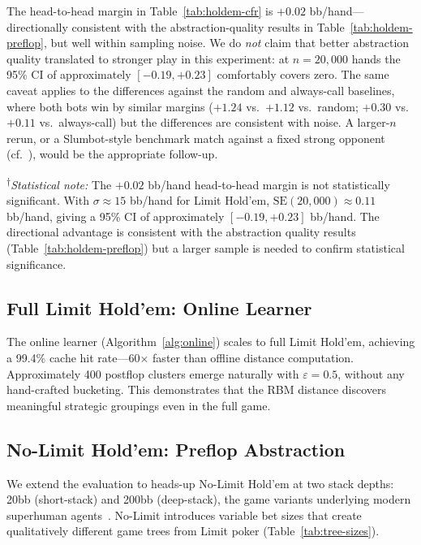 \documentclass[11pt]{article}
\begin{document}
The head-to-head margin in Table~\ref{tab:holdem-cfr} is $+0.02$
bb/hand---directionally consistent with the abstraction-quality
results in Table~\ref{tab:holdem-preflop}, but well within sampling
noise. We do \emph{not} claim that better abstraction quality
translated to stronger play in this experiment: at $n = 20{,}000$
hands the 95\% CI of approximately $[-0.19, +0.23]$ comfortably covers
zero. The same caveat applies to the differences against the random
and always-call baselines, where both bots win by similar margins
($+1.24$ vs.\ $+1.12$ vs.\ random; $+0.30$ vs.\ $+0.11$ vs.\
always-call) but the differences are consistent with noise. A
larger-$n$ rerun, or a Slumbot-style benchmark match against a fixed
strong opponent (cf.\ \citealt{johanson2013evaluating}), would be the
appropriate follow-up.

\noindent\textsuperscript{$\dagger$}\textit{Statistical note:} The
$+0.02$ bb/hand head-to-head margin is not statistically significant.
With $\sigma \approx 15$ bb/hand for Limit Hold'em, $\mathrm{SE}(20{,}000)
\approx 0.11$ bb/hand, giving a 95\% CI of approximately
$[-0.19, +0.23]$ bb/hand. The directional advantage is consistent with
the abstraction quality results (Table~\ref{tab:holdem-preflop}) but
a larger sample is needed to confirm statistical significance.

\subsection{Full Limit Hold'em: Online Learner}

The online learner (Algorithm~\ref{alg:online}) scales to full Limit
Hold'em, achieving a 99.4\% cache hit rate---60$\times$ faster than
offline distance computation. Approximately 400 postflop clusters emerge
naturally with $\varepsilon = 0.5$, without any hand-crafted bucketing.
This demonstrates that the RBM distance discovers meaningful strategic
groupings even in the full game.

\subsection{No-Limit Hold'em: Preflop Abstraction}
\label{sec:experiments-nl}

We extend the evaluation to heads-up No-Limit Hold'em at two stack
depths: 20bb (short-stack) and 200bb (deep-stack), the game variants
underlying modern superhuman
agents~\citep{brown2018superhuman,moravvcik2017deepstack}. No-Limit
introduces variable bet sizes that create qualitatively different game
trees from Limit poker (Table~\ref{tab:tree-sizes}).
\end{document}
